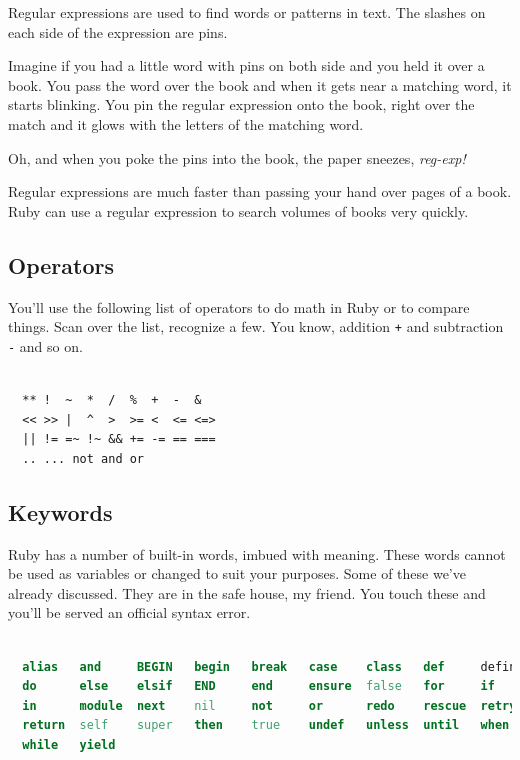 \documentclass[10pt,twoside]{report}
\begin{document}
Regular expressions are used to find words or patterns in text.  The
slashes on each side of the expression are pins.

Imagine if you had a little word with pins on both side and you held
it over a book.  You pass the word over the book and when it gets near
a matching word, it starts blinking.  You pin the regular expression
onto the book, right over the match and it glows with the letters of
the matching word.

Oh, and when you poke the pins into the book, the paper sneezes, {\em
  reg-exp!}

Regular expressions are much faster than passing your hand over pages
of a book.  Ruby can use a regular expression to search volumes of
books very quickly.



\subsection{Operators}



You'll use the following list of operators to do math in Ruby or to
compare things. Scan over the list, recognize a few.  You know,
addition \lstinline[breaklines=true]|+| and subtraction
\lstinline[breaklines=true]|-| and so on.


\begin{lstlisting}

  ** !  ~  *  /  %  +  -  & 
  << >> |  ^  >  >= <  <= <=>
  || != =~ !~ && += -= == ===
  .. ... not and or

\end{lstlisting}




\subsection{Keywords}



Ruby has a number of built-in words, imbued with meaning.  These words
cannot be used as variables or changed to suit your purposes.  Some of
these we've already discussed.  They are in the safe house, my friend.
You touch these and you'll be served an official syntax error.


\begin{lstlisting}[basicstyle=\ttfamily\color{basiccolor},
    commentstyle = \ttfamily\color{commentcolor},
    keywordstyle=\ttfamily\color{keywordscolor},
    stringstyle=\color{stringcolor},
    language=Ruby,
    basicstyle=\small\ttfamily,
    showstringspaces=false,
  ]

  alias   and     BEGIN   begin   break   case    class   def     defined 
  do      else    elsif   END     end     ensure  false   for     if 
  in      module  next    nil     not     or      redo    rescue  retry
  return  self    super   then    true    undef   unless  until   when 
  while   yield

\end{lstlisting}
\end{document}
